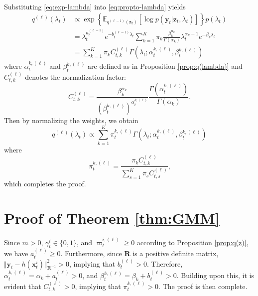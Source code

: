 \documentclass[10pt,twocolumn,twoside]{IEEEtran}
\newcommand{\e}[1]{\exp\left\{#1\right\}}
\newcommand{\E}[2][]{ \mathbb{E}_{#1}\left[#2\right] } %
\newcommand{\cm}{\text{,}} %
\newcommand{\fs}{\text{.}} %
\newcommand{\x}{{ \bm{x} }}
\newcommand{\y}{{ \bm{y} }}
\newcommand{\z}{{ \bm{z} }}
\begin{document}
\begin{appendices}
Substituting \eqref{eq:exp-lambda} into \eqref{eq:propto-lambda} yields
\begin{equation*}
\begin{split}
    q^{(\ell)}(\lambda_t) &\propto \e{\E[q^{(\ell-1)}(\z_t)]{\log{p(\y_t|\z_t,\lambda_t)}}}p(\lambda_t) \\
    &= \lambda_t^{a_t^{(\ell-1)}}e^{-b_t^{(\ell-1)}\lambda_t}\sum_{k=1}^K\pi_k\frac{\beta_k^{\alpha_k}}{\Gamma(\alpha_k)}\lambda_t^{\alpha_k-1}e^{-\beta_k\lambda_t} \\
    &= \sum_{k=1}^K\pi_kC_{t,k}^{(\ell)}\Gamma(\lambda_t;\alpha_t^{k,(\ell)},\beta_t^{k,(\ell)})
\end{split}
\end{equation*}
where $\alpha_t^{k,(\ell)}$ and $\beta_t^{k,(\ell)}$ are defined as in Proposition \ref{prop:q(lambda)} and $C_{t,k}^{(\ell)}$ denotes the normalization factor:
$$
C_{t,k}^{(\ell)} = \frac{\beta_k^{\alpha_k}}{(\beta_t^{k,(\ell)})^{\alpha_t^{k,(\ell)}}}\frac{\Gamma(\alpha_t^{k,(\ell)})}{\Gamma(\alpha_k)} \fs
$$
Then by normalizing the weights, we obtain
$$
q^{(\ell)}(\lambda_t) \propto \sum_{k=1}^K\pi_t^{k,(\ell)}\Gamma(\lambda_t;\alpha_t^{k,(\ell)},\beta_t^{k,(\ell)})
$$
where
$$
\pi_t^{k,(\ell)} = \frac{\pi_kC_{t,k}^{(\ell)}}{\sum_{s=1}^K\pi_sC_{t,s}^{(\ell)}} \cm
$$
which completes the proof.

\section{Proof of Theorem \ref{thm:GMM}} \label{app:thm-GMM} %
Since $m>0$, $\gamma_t^i\in\{0,1\}$, and $\varpi_t^{i,(\ell)}\geq0$ according to Proposition \ref{prop:q(z)}, we have $a_t^{(\ell)}\geq0$. Furthermore, since $\bm{R}$ is a positive definite matrix, $\Vert\y_t-h(\x_t^i)\Vert^2_{\bm{R}^{-1}}>0$, implying that $b_t^{(\ell)}>0$. Therefore, $\alpha_t^{k,(\ell)}=\alpha_k+a_t^{(\ell)}>0$, and $\beta_t^{k,(\ell)}=\beta_k+b_t^{(\ell)}>0$. Building upon this, it is evident that $C_{t,k}^{(\ell)}>0$, implying that $\pi_t^{k,(\ell)}>0$. The proof is then complete.


\end{appendices}
\end{document}
